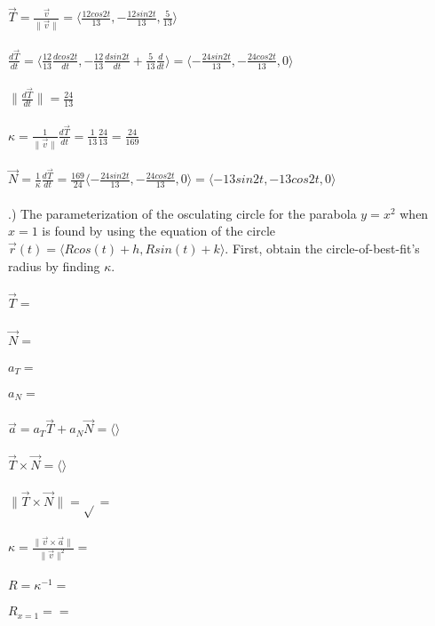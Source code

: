 \documentclass[12pt]{article}
\begin{document}
\noindent $\vec{T} = \frac{\vec{v}}{\| \vec{v} \|} = \langle \frac{12cos{2t}}{13}, -\frac{12sin{2t}}{13}, \frac{5}{13}\rangle$\\\\
\noindent $\frac{d\vec{T}}{dt} = \langle \frac{12}{13}\frac{dcos{2t}}{dt} , -\frac{12}{13}\frac{dsin{2t}}{dt} + \frac{5}{13}\frac{d}{dt}\rangle
= \langle -\frac{24sin{2t}}{13}, -\frac{24cos{2t}}{13}, 0 \rangle$\\\\
\noindent $\| \frac{d\vec{T}}{dt} \|  = \frac{24}{13}$\\\\
\noindent $\kappa = \frac{1}{\| \vec{v} \| }\frac{d\vec{T}}{dt} = \frac{1}{13}\frac{24}{13} =\frac{24}{169}$\\\\
\noindent $\vec{N} = \frac{1}{\kappa}\frac{d\vec{T}}{dt} = \frac{169}{24}\langle -\frac{24sin{2t}}{13}, -\frac{24cos{2t}}{13}, 0\rangle 
 = \langle -13sin{2t}, -13cos{2t}, 0\rangle $\\\\
.) The parameterization of the osculating circle for the parabola $y = x^{2}$ when $x = 1$ is found 
by using the equation of the circle $\vec{r}(t) = \langle Rcos(t) + h, Rsin(t) + k \rangle$. First, obtain the circle-of-best-fit's radius by finding $\kappa$.\\\\
\noindent $\vec{T} = \frac{}{}$\\\\
\noindent $\vec{N} = \frac{}{}$\\\\
\noindent $a_{T} = $\\\\
\noindent $a_{N} = $\\\\
\noindent $\vec{a} = a_{T}\vec{T} + a_{N}\vec{N} = \langle \rangle$\\\\
\noindent $\vec{T} \times \vec{N}  = \langle \rangle$\\\\
\noindent $\| \vec{T} \times \vec{N} \|  = \sqrt{} = $\\\\
\noindent $\kappa = \frac{\| \vec{v} \times \vec{a} \|}{\| \vec{v} \| ^{2}} = $\\\\
\noindent $R = \kappa^{-1} = $\\\\
\noindent $R_{x = 1} =  = $\\\\
\end{document}
